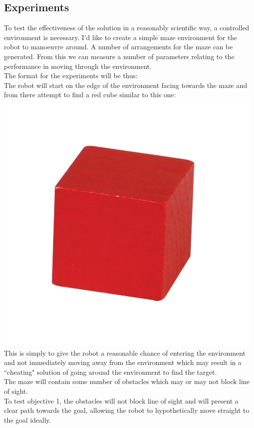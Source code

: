\documentclass[10pt,a4paper]{report}
\begin{document}
	\subsection*{Experiments}
		To test the effectiveness of the solution in a reasonably scientific way, a controlled environment is necessary. I'd like to create a simple maze environment for the robot to manoeuvre around. A number of arrangements for the maze can be generated. From this we can measure a number of parameters relating to the performance in moving through the environment. \\
		The format for the experiments will be thus: \\
		The robot will start on the edge of the environment facing towards the maze and from there attempt to find a red cube similar to this one: \\
		\includegraphics[scale=0.2]{RedCube}  \\
		This is simply to give the robot a reasonable chance of entering the environment and not immediately moving away from the environment which may result in a ``cheating" solution of going around the environment to find the target. \\
		The maze will contain some number of obstacles which may or may not block line of sight. \\
		To test objective 1, the obstacles will not block line of sight and will present a clear path towards the goal, allowing the robot to hypothetically move straight to the goal ideally. \\
\end{document}
